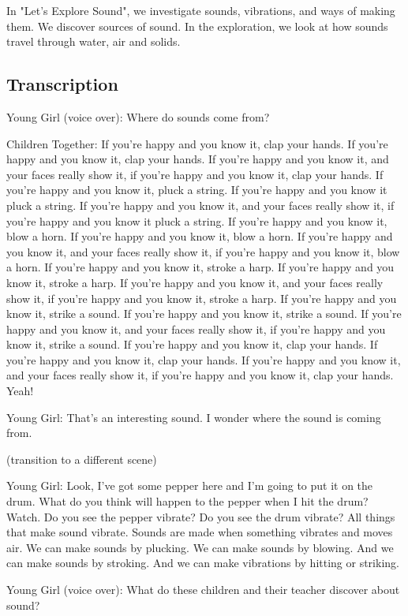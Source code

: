 In "Let's Explore Sound", we investigate sounds, vibrations, and ways of making them. We discover sources of sound. In the exploration, we look at how sounds travel through water, air and solids.

\subsection{Transcription}

Young Girl (voice over): Where do sounds come from?

Children Together: If you're happy and you know it, clap your hands. If you're happy and you know it, clap your hands. If you're happy and you know it, and your faces really show it, if you're happy and you know it, clap your hands. If you're happy and you know it, pluck a string. If you're happy and you know it pluck a string. If you're happy and you know it, and your faces really show it, if you're happy and you know it pluck a string. If you're happy and you know it, blow a horn. If you're happy and you know it, blow a horn. If you're happy and you know it, and your faces really show it, if you're happy and you know it, blow a horn. If you're happy and you know it, stroke a harp. If you're happy and you know it, stroke a harp. If you're happy and you know it, and your faces really show it, if you're happy and you know it, stroke a harp. If you're happy and you know it, strike a sound. If you're happy and you know it, strike a sound. If you're happy and you know it, and your faces really show it, if you're happy and you know it, strike a sound. If you're happy and you know it, clap your hands. If you're happy and you know it, clap your hands. If you're happy and you know it, and your faces really show it, if you're happy and you know it, clap your hands. Yeah!

Young Girl: That's an interesting sound. I wonder where the sound is coming from.

(transition to a different scene)

Young Girl: Look, I've got some pepper here and I'm going to put it on the drum. What do you think will happen to the pepper when I hit the drum? Watch. Do you see the pepper vibrate? Do you see the drum vibrate? All things that make sound vibrate. Sounds are made when something vibrates and moves air. We can make sounds by plucking. We can make sounds by blowing. And we can make sounds by stroking. And we can make vibrations by hitting or striking.

Young Girl (voice over): What do these children and their teacher discover about sound?

